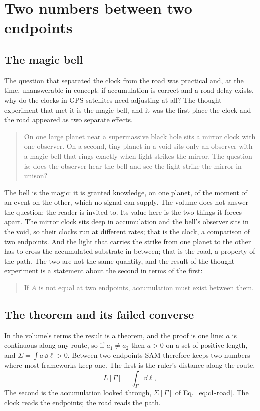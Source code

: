 \section{Two numbers between two endpoints}
\label{sec:c1-two}

\subsection{The magic bell}

The question that separated the clock from the road was practical and, at the time, unanswerable in concept: if accumulation is correct and a road delay exists, why do the clocks in GPS satellites need adjusting at all? The thought experiment that met it is the magic bell, and it was the first place the clock and the road appeared as two separate effects.
\begin{quote}
On one large planet near a supermassive black hole sits a mirror clock with one observer. On a second, tiny planet in a void sits only an observer with a magic bell that rings exactly when light strikes the mirror. The question is: does the observer hear the bell and see the light strike the mirror in unison?
\end{quote}
The bell is the magic: it is granted knowledge, on one planet, of the moment of an event on the other, which no signal can supply. The volume does not answer the question; the reader is invited to. Its value here is the two things it forces apart. The mirror clock sits deep in accumulation and the bell's observer sits in the void, so their clocks run at different rates; that is the clock, a comparison of two endpoints. And the light that carries the strike from one planet to the other has to cross the accumulated substrate in between; that is the road, a property of the path. The two are not the same quantity, and the result of the thought experiment is a statement about the second in terms of the first:
\begin{quote}
If $A$ is not equal at two endpoints, accumulation must exist between them.
\end{quote}

\subsection{The theorem and its failed converse}

In the volume's terms the result is a theorem, and the proof is one line: $a$ is continuous along any route, so if $a_1\ne a_2$ then $a>0$ on a set of positive length, and $\Sigma=\int a\,\dd\ell>0$. Between two endpoints SAM therefore keeps two numbers where most frameworks keep one. The first is the ruler's distance along the route,
\begin{equation}
L[\Gamma]=\int_\Gamma \dd\ell,
\end{equation}
The second is the accumulation looked through, $\Sigma[\Gamma]$ of Eq.~\eqref{eq:c1-road}. The clock reads the endpoints; the road reads the path.

